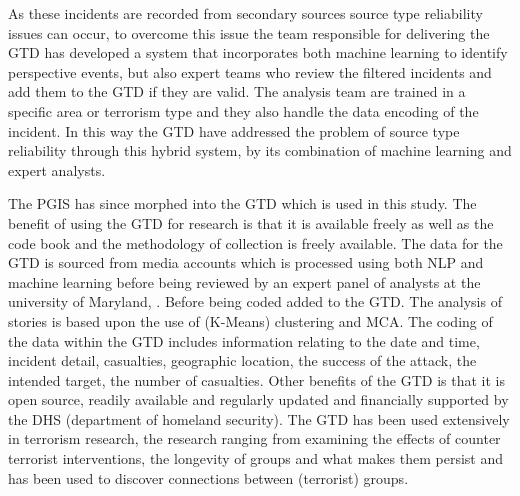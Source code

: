 As these incidents are recorded from secondary sources source type reliability issues can occur, to overcome this issue the team responsible for delivering the GTD has developed a system that incorporates both machine learning to identify perspective events, but also expert teams who review the filtered incidents and add them to the GTD if they are valid. The analysis team are trained in a specific area  or terrorism type and they also handle the data encoding of the incident. In this way the GTD have addressed the problem of source type reliability through this  hybrid system, by its combination of machine learning and expert analysts.

The PGIS has since morphed into the GTD which is used in this study. The benefit of using the GTD for research is that it is available freely as well as the code book and the methodology of collection is freely available. The data for the GTD is sourced from media accounts which is processed using both NLP and machine learning before being reviewed by an expert panel of analysts at the university of Maryland, \citep{fivethirtyeightGTD2015}. Before being coded added to the GTD. The analysis of stories is based upon the use of (K-Means) clustering and MCA. The coding of the data within the GTD includes information relating to the date and time, incident detail, casualties, geographic location, the success of the attack, the intended target, the number of casualties. Other benefits of the GTD is that it is open source, readily available and regularly updated and financially supported by the DHS (department of homeland security). 
The GTD has been used extensively in terrorism research, the research ranging from examining the effects of counter terrorist interventions, the longevity of groups and what makes them persist and  has been used to discover connections between (terrorist) groups.

